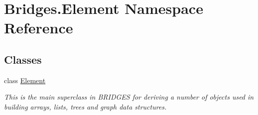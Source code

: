 \hypertarget{namespace_bridges_1_1_element}{}\section{Bridges.\+Element Namespace Reference}
\label{namespace_bridges_1_1_element}
\subsection*{Classes}
\begin{DoxyCompactItemize}
\item 
class \mbox{\hyperlink{class_bridges_1_1_element_1_1_element}{Element}}
\begin{DoxyCompactList}\small\item\em This is the main superclass in B\+R\+I\+D\+G\+ES for deriving a number of objects used in building arrays, lists, trees and graph data structures. \end{DoxyCompactList}\end{DoxyCompactItemize}
